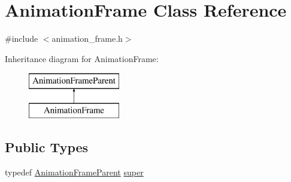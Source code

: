 \hypertarget{a00012}{\section{Animation\-Frame Class Reference}
\label{a00012}
}


{\ttfamily \#include $<$animation\-\_\-frame.\-h$>$}

Inheritance diagram for Animation\-Frame\-:\begin{figure}[H]
\begin{center}
\leavevmode
\includegraphics[height=2.000000cm]{a00012}
\end{center}
\end{figure}
\subsection*{Public Types}
\begin{DoxyCompactItemize}
\item 
typedef \hyperlink{a00171_a8b295c639a8d2391dc4584107c78db16}{Animation\-Frame\-Parent} \hyperlink{a00012_a090eb07704cc6d7005dc5cd99da6d8bd}{super}
\end{DoxyCompactItemize}

